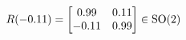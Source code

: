 \documentclass[preview]{standalone}
\begin{document}
\begin{align*}
\special{dvisvgm:raw <g id='unique000'>}R(-0.11) = \begin{bmatrix} 0.99 & 0.11 \\ -0.11 & 0.99 \end{bmatrix} \in \text{SO}(2)\special{dvisvgm:raw </g>}
\end{align*}
\end{document}
